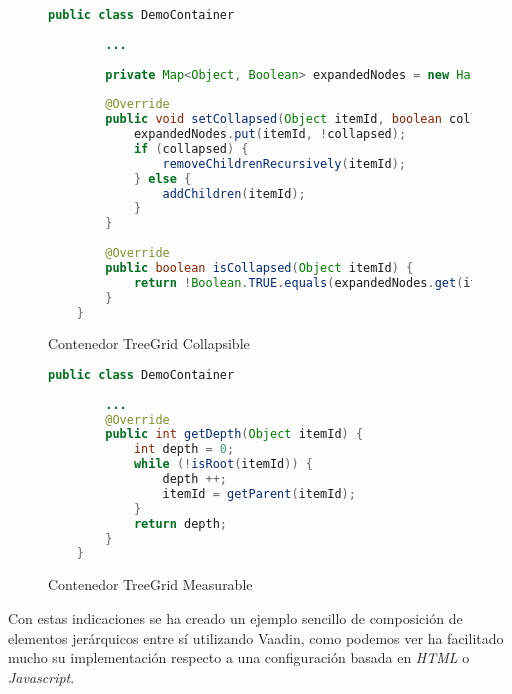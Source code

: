 \begin{figure}[!tb]
	\centering
	\begin{lstlisting}[language=Java]
	public class DemoContainer
	
		...
	
		private Map<Object, Boolean> expandedNodes = new HashMap<>();
			
		@Override
		public void setCollapsed(Object itemId, boolean collapsed) {
			expandedNodes.put(itemId, !collapsed);	
			if (collapsed) {
				removeChildrenRecursively(itemId);
			} else {
				addChildren(itemId);
			}
		}
		
		@Override
		public boolean isCollapsed(Object itemId) {
			return !Boolean.TRUE.equals(expandedNodes.get(itemId));
		}
	}
	\end{lstlisting}
	\caption{Contenedor TreeGrid Collapsible}
	\label{fig:demoContainerCollapsible}
\end{figure}

\begin{figure}[!tb]
	\centering
	\begin{lstlisting}[language=Java]	
	public class DemoContainer
	
		...
		@Override
		public int getDepth(Object itemId) {
			int depth = 0;
			while (!isRoot(itemId)) {
				depth ++;
				itemId = getParent(itemId);
			}
			return depth;
		}
	}
	\end{lstlisting}
	\caption{Contenedor TreeGrid Measurable}
	\label{fig:demoContainerMeasurable}
\end{figure}


Con estas indicaciones se ha creado un ejemplo sencillo de composición de elementos jerárquicos entre sí utilizando Vaadin, como podemos ver ha facilitado mucho su implementación respecto a una configuración basada en \emph{HTML} o \emph{Javascript}.

